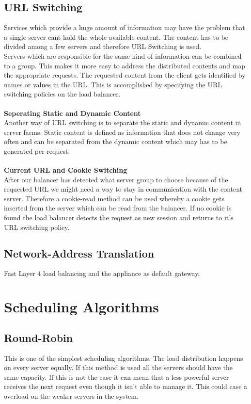 \documentclass[12p]{article}
\begin{document}
	\subsection{URL Switching}
	Services which provide a huge amount of information may have the problem that a single server cant hold the whole available content. The content has to be divided among a few servers and therefore URL Switching is used.\\
	Servers which are responsible for the same kind of information can be combined to a group. This makes it more easy to address the distributed contents and map the appropriate requests.
	The requested content from the client gets identified by names or values in the URL. This is accomplished by specifying the URL switching policies on the load balancer.\\
	\\
	\textbf{Seperating Static and Dynamic Content}\\
	Another way of URL switching is to separate the static and dynamic content in server farms. Static content is defined as information that does not change very often and can be separated from the dynamic content which may has to be generated per request.\\
	\\
	\textbf{Current URL and Cookie Switching}\\
	After our balancer has detected what server group to choose because of the requested URL we might need a way to stay in communication with the content server. Therefore a cookie-read method can be used whereby a cookie gets inserted from the server which can be read from the balancer.
	If no cookie is found the load balancer detects the request as new session and returns to it's URL switching policy.
	
	\subsection{Network-Address Translation}
	Fast Layer 4 load balancing and the appliance as default gateway.
	
	\newpage
	\section{Scheduling Algorithms}
	\subsection{Round-Robin}
	This is one of the simplest scheduling algorithms. The load distribution happens on every server equally. If this method is used all the servers should have the same capacity. If this is not the case it can mean that a less powerful server receives the next request even though it isn't able to manage it. This could case a overload on the weaker servers in the system. 
	
\end{document}
